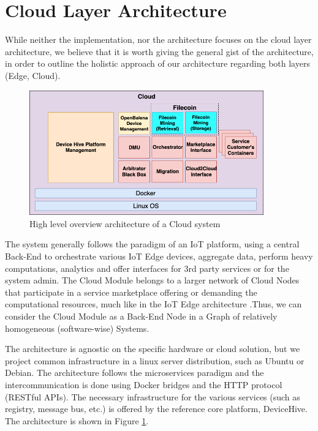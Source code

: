 \section{Cloud Layer Architecture}

While neither the implementation, nor the architecture focuses on the cloud layer architecture, we believe that it is worth giving the general gist of the architecture, in order to outline the holistic approach of our architecture regarding both layers (Edge, Cloud).

\begin{figure}[h]
    \centering
    \includegraphics[width=0.9\textwidth]{images/CloudArch_v6.png}
    \caption{High level overview architecture of a Cloud system}
    \label{fig:cloud}
\end{figure}

The system generally follows the paradigm of an IoT platform, using a central Back-End to orchestrate various IoT Edge devices, aggregate data, perform heavy computations, analytics and offer interfaces for 3rd party services or for the system admin. The Cloud Module belongs to a larger network of Cloud Nodes that participate in a service marketplace offering or demanding the computational resources, much like in the IoT Edge architecture .Thus, we can consider the Cloud Module as a Back-End Node in a Graph of relatively homogeneous (software-wise) Systems.
 
The architecture is agnostic on the specific hardware or cloud solution, but we project common infrastructure in a linux server distribution, such as Ubuntu or Debian. The architecture follows the microservices paradigm and the intercommunication is done using Docker bridges and the HTTP protocol (RESTful APIs). The necessary infrastructure for the various services (such as registry, message bus, etc.) is offered by the reference core platform, DeviceHive\cite{devicehive}. The architecture is shown in Figure \ref{fig:cloud}.

